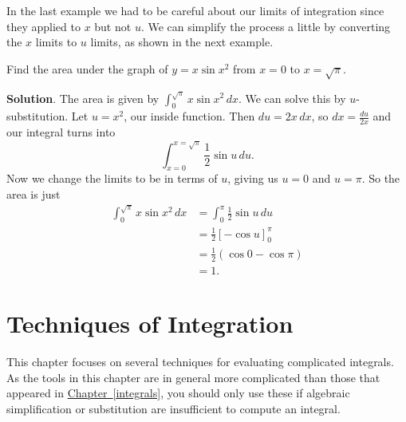 \documentclass[10pt,]{book}
\theoremstyle{ptxplainnotitle}
\theoremstyle{ptxplaintitle}
\theoremstyle{ptxplainnotitle}
\theoremstyle{ptxplaintitle}
\theoremstyle{ptxplainnotitle}
\theoremstyle{ptxplaintitle}
\theoremstyle{ptxdefinitionnotitle}
\theoremstyle{ptxdefinitiontitle}
\theoremstyle{ptxdefinitionnotitle}
\theoremstyle{ptxdefinitiontitle}
\theoremstyle{ptxdefinitionnotitle}
\theoremstyle{ptxdefinitiontitle}
\theoremstyle{ptxdefinitionnotitle}
\theoremstyle{ptxdefinitiontitle}
\theoremstyle{ptxdefinitionnotitle}
\theoremstyle{ptxdefinitiontitle}
\numberwithin{equation}{section}
\begin{document}
\hypertarget{p-491}{}%
In the last example we had to be careful about our limits of integration since they applied to \(x\) but not \(u\). We can simplify the process a little by converting the \(x\) limits to \(u\) limits, as shown in the next example.%
\begin{example}\label{example-area-under-sine}
\hypertarget{p-492}{}%
Find the area under the graph of \(y = x\sin x^{2}\) from \(x=0\) to \(x = \sqrt{\pi}\).%
\par\smallskip%
\noindent\textbf{Solution}.\hypertarget{solution-109}{}\quad%
\hypertarget{p-493}{}%
The area is given by \(\int_{0}^{\sqrt{\pi}}x\sin x^{2}\,dx\). We can solve this by \(u\)-substitution. Let \(u = x^{2}\), our inside function. Then \(du = 2x\,dx\), so \(dx = \frac{du}{2x}\) and our integral turns into%
\begin{equation*}
\int_{x=0}^{x=\sqrt{\pi}}\frac{1}{2}\sin u\,du.
\end{equation*}
Now we change the limits to be in terms of \(u\), giving us \(u = 0\) and \(u = \pi\). So the area is just%
\begin{align*}
\int_{0}^{\sqrt{\pi}}x\sin x^{2}\,dx & = \int_{0}^{\pi}\frac{1}{2}\sin u\,du \\
& = \frac{1}{2}[-\cos u]_{0}^{\pi} \\
& = \frac{1}{2}(\cos0 - \cos\pi) \\
& = 1. 
\end{align*}
%
\end{example}
\typeout{************************************************}
\typeout{************************************************}
\chapter[{Techniques of Integration}]{Techniques of Integration}\label{techniques-of-integration}
\hypertarget{p-494}{}%
This chapter focuses on several techniques for evaluating complicated integrals. As the tools in this chapter are in general more complicated than those that appeared in \hyperref[integrals]{Chapter~\ref{integrals}}, you should only use these if algebraic simplification or substitution are insufficient to compute an integral.%
\typeout{************************************************}
\typeout{************************************************}
\end{document}
